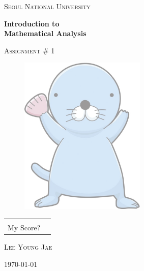 \documentclass{article}
\begin{document}
\begin{titlepage}
\centering
{\scshape\LARGE Seoul National University \par}
\vspace{1.5cm}
{\huge\bfseries Introduction to\\Mathematical Analysis\par}
\vspace{1cm}
{\scshape\Large Assignment \# 1\par}

\vspace{1cm}

\begin{figure}[ht!]
\centering
\includegraphics[width=60mm]{bonobono.png}
\end{figure}

\vspace{2cm}

\arrayrulewidth=1.2pt
\begin{tabular}{p{2.5cm}p{2cm}}
\centering
& \\
\cline{2-2}
\vspace{-.73cm}
My Score? & \\
\end{tabular}



\vfill
\vspace{1cm}\par
\textsc{\large Lee Young Jae}
\vspace{1cm}\par
{\Large \today\par}
\end{titlepage}

\setlength{\parindent}{0cm}
\end{document}
